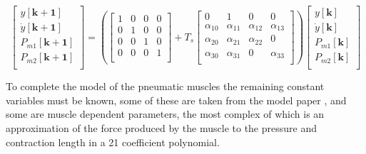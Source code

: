 \documentclass[11pt,a4paper]{article}
\begin{document}
\begin{equation}
    \begin{bmatrix}
        y\left[\boldsymbol{k+1}\right]\\
        \dot{y}\left[\boldsymbol{k+1}\right]\\
        P_{m1}\left[\boldsymbol{k+1}\right]\\
        P_{m2}\left[\boldsymbol{k+1}\right]\\
    \end{bmatrix}
    =
    \left(
    \begin{bmatrix}
        1 & 0 & 0 & 0\\
        0 & 1 & 0 & 0\\
        0 & 0 & 1 & 0\\
        0 & 0 & 0 & 1\\
    \end{bmatrix}
    + T_s
    \begin{bmatrix}
        0 & 1 & 0 & 0\\
        \alpha_{10} & \alpha_{11} & \alpha_{12} & \alpha_{13}\\
        \alpha_{20} & \alpha_{21} & \alpha_{22} & 0\\
        \alpha_{30} & \alpha_{31} & 0 & \alpha_{33}\\
    \end{bmatrix}
    \right)
    \begin{bmatrix}
        y\left[\boldsymbol{k}\right]\\
        \dot{y}\left[\boldsymbol{k}\right]\\
        P_{m1}\left[\boldsymbol{k}\right]\\
        P_{m2}\left[\boldsymbol{k}\right]\\
    \end{bmatrix}
    \label{math:discretistion_model}
\end{equation}\newline

To complete the model of the pneumatic muscles the remaining constant variables must be known, some of these are taken from the model paper \cite{hosovsky_2012}, and some are muscle dependent parameters, the most complex of which is an approximation of the force produced by the muscle to the pressure and contraction length in a 21 coefficient polynomial.
\end{document}
